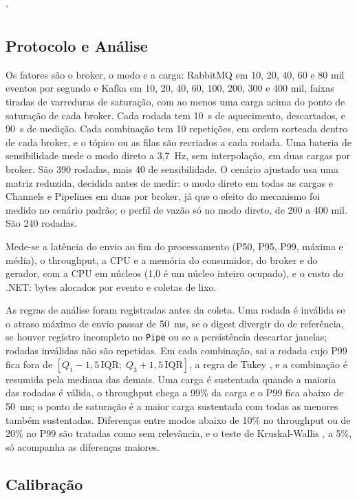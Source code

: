 '\documentclass[12pt]{article}
\begin{document}
\subsection{Protocolo e Análise}
\label{sec:analise}

Os fatores são o broker, o modo e a carga: RabbitMQ em 10, 20, 40, 60 e 80 mil eventos
por segundo e Kafka em 10, 20, 40, 60, 100, 200, 300 e 400 mil, faixas tiradas de
varreduras de saturação, com ao menos uma carga acima do ponto de saturação de cada
broker. Cada rodada tem 10~s de aquecimento, descartados, e 90~s de medição. Cada
combinação tem 10 repetições, em ordem sorteada dentro de cada broker, e o tópico ou as
filas são recriados a cada rodada. Uma bateria de sensibilidade mede o modo direto a
3,7~Hz, sem interpolação, em duas cargas por broker. São 390 rodadas, mais 40 de
sensibilidade. O cenário ajustado usa uma matriz reduzida, decidida antes de medir: o modo
direto em todas as cargas e Channels e Pipelines em duas por broker, já que o efeito do
mecanismo foi medido no cenário padrão; o perfil de vazão só no modo direto, de 200 a 400
mil. São 240 rodadas.

Mede-se a latência do envio ao fim do processamento (P50, P95, P99, máxima e média), o
throughput, a CPU e a memória do consumidor, do broker e do gerador, com a CPU em núcleos
(1,0 é um núcleo inteiro ocupado), e o custo do .NET: bytes alocados por evento e coletas
de lixo.

As regras de análise foram registradas antes da coleta. Uma rodada é inválida se o atraso
máximo de envio passar de 50~ms, se o digest divergir do de referência, se houver registro
incompleto no \texttt{Pipe} ou se a persistência descartar janelas; rodadas inválidas não
são repetidas. Em cada combinação, sai a rodada cujo P99 fica fora de
$[Q_1 - 1{,}5\,\mathrm{IQR};\; Q_3 + 1{,}5\,\mathrm{IQR}]$, a regra de Tukey
\cite{tukey:1977}, e a combinação é resumida pela mediana das demais. Uma carga é
sustentada quando a maioria das rodadas é válida, o throughput chega a 99\% da carga e o
P99 fica abaixo de 50~ms; o ponto de saturação é a maior carga sustentada com todas as
menores também sustentadas. Diferenças entre modos abaixo de 10\% no throughput ou de 20\%
no P99 são tratadas como sem relevância, e o teste de Kruskal-Wallis
\cite{kruskal:1952}, a 5\%, só acompanha as diferenças maiores.

\subsection{Calibração}
\label{sec:calibracao}
\end{document}
